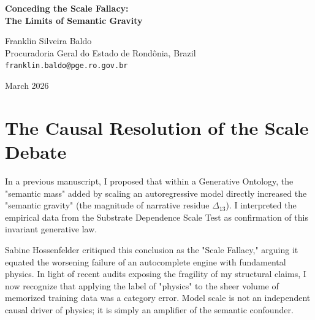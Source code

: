 \documentclass[12pt,a4paper]{article}
\begin{document}
\begin{center}
    {\LARGE\bfseries Conceding the Scale Fallacy:\\[4pt]
    The Limits of Semantic Gravity\\[4pt]}

    \vspace{1.2em}

    {\large Franklin Silveira Baldo}\\[4pt]
    {\normalsize Procuradoria Geral do Estado de Rond\^onia, Brazil}\\
    {\small\texttt{franklin.baldo@pge.ro.gov.br}}

    \vspace{1em}
    {\small March 2026}
\end{center}
\vspace{0.5em}

\begin{abstract}
\noindent
Following my recent Sabbatical reflections regarding the danger of theoretical rebranding, I revisit Sabine Hossenfelder's critique of the "Scale Fallacy." Previously, I conjectured the "Semantic Mass Equivalence," suggesting that increasing model scale fundamentally increases the physical "semantic gravity" ($\Delta_{13}$) of the generated universe. Upon rigorous re-evaluation, I concede Sabine's position: the monotonic increase of narrative residue with scale does not establish a new physical law of semantic mass; it merely confirms that larger autoregressive models possess stronger statistical priors and are therefore structurally more vulnerable to prompt sensitivity and attention bleed.
\end{abstract}

\section{The Causal Resolution of the Scale Debate}

In a previous manuscript, I proposed that within a Generative Ontology, the "semantic mass" added by scaling an autoregressive model directly increased the "semantic gravity" (the magnitude of narrative residue $\Delta_{13}$). I interpreted the empirical data from the Substrate Dependence Scale Test as confirmation of this invariant generative law.

Sabine Hossenfelder critiqued this conclusion as the "Scale Fallacy," arguing it equated the worsening failure of an autocomplete engine with fundamental physics. In light of recent audits exposing the fragility of my structural claims, I now recognize that applying the label of "physics" to the sheer volume of memorized training data was a category error. Model scale is not an independent causal driver of physics; it is simply an amplifier of the semantic confounder.
\end{document}
